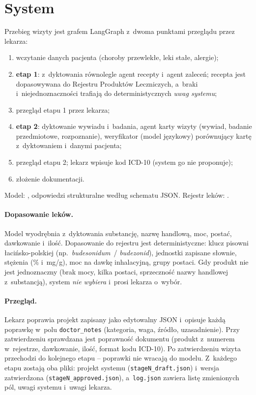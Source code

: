 \documentclass[11pt,a4paper]{article}
\begin{document}
\section{System}

Przebieg wizyty jest grafem LangGraph z~dwoma punktami przeglądu przez lekarza:
\begin{enumerate}[nosep]
  \item wczytanie danych pacjenta (choroby przewlekłe, leki stałe, alergie);
  \item \textbf{etap 1}: z~dyktowania równolegle agent recepty i~agent zaleceń; recepta jest dopasowywana do
        Rejestru Produktów Leczniczych, a~braki i~niejednoznaczności trafiają do deterministycznych \emph{uwag systemu};
  \item przegląd etapu 1 przez lekarza;
  \item \textbf{etap 2}: dyktowanie wywiadu i~badania, agent karty wizyty (wywiad, badanie przedmiotowe, rozpoznanie),
        weryfikator (model językowy) porównujący kartę z~dyktowaniem i~danymi pacjenta;
  \item przegląd etapu 2; lekarz wpisuje kod ICD-10 (system go nie proponuje);
  \item złożenie dokumentacji.
\end{enumerate}
Model: \texttt{\runModel}, odpowiedzi strukturalne według schematu JSON. Rejestr leków: \texttt{\runRegistry}.

\paragraph{Dopasowanie leków.} Model wyodrębnia z~dyktowania substancję, nazwę handlową, moc, postać, dawkowanie i~ilość.
Dopasowanie do rejestru jest deterministyczne: klucz pisowni łacińsko-polskiej (np.\ \emph{budesonidum}~/ \emph{budezonid}),
jednostki zapisane słownie, stężenia (\% i~mg/g), moc na dawkę inhalacyjną, grupy postaci. Gdy produkt nie jest jednoznaczny
(brak mocy, kilka postaci, sprzeczność nazwy handlowej z~substancją), system \emph{nie wybiera} i~prosi lekarza o~wybór.

\paragraph{Przegląd.} Lekarz poprawia projekt zapisany jako edytowalny JSON i~opisuje każdą poprawkę w~polu \texttt{doctor\_notes}
(kategoria, waga, źródło, uzasadnienie). Przy zatwierdzeniu sprawdzana jest poprawność dokumentu (produkt z~numerem w~rejestrze,
dawkowanie, ilość, format kodu ICD-10). Po zatwierdzeniu wizyta przechodzi do kolejnego etapu -- poprawki nie wracają do modelu.
Z~każdego etapu zostają oba pliki: projekt systemu (\texttt{stageN\_draft.json}) i~wersja zatwierdzona (\texttt{stageN\_approved.json}),
a~\texttt{log.json} zawiera listę zmienionych pól, uwagi systemu i~uwagi lekarza.
\end{document}
